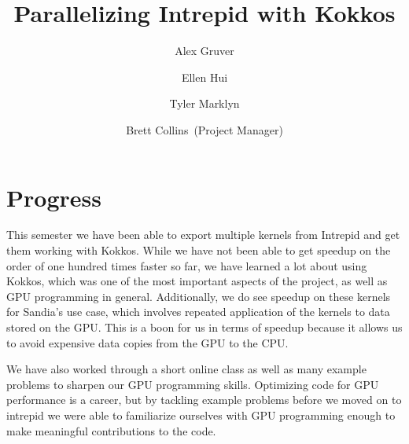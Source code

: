 \documentclass{hmcclinic}
\title{Parallelizing Intrepid with Kokkos}
\author{Alex Gruver \and Ellen Hui \and Tyler Marklyn \and Brett Collins~(Project Manager)}
\begin{document}





\maketitle

\mainmatter




\section*{Progress}
This semester we have been able to export multiple kernels from Intrepid and get
them working with Kokkos. While we have not been able to get speedup on the
order of one hundred times faster so far, we have learned a lot about using
Kokkos, which was one of the most important aspects of the project, as well as
GPU programming in general. Additionally, we do see speedup on these kernels for
Sandia's use case, which involves repeated application of the kernels to data
stored on the GPU. This is a boon for us in terms of speedup because it allows
us to avoid expensive data copies from the GPU to the CPU.

We have also worked through a short online class as well as many example
problems to sharpen our GPU programming skills. Optimizing code for GPU
performance is a career, but by tackling example problems before we moved on to
intrepid we were able to familiarize ourselves with GPU programming enough to
make meaningful contributions to the code.
\end{document}

